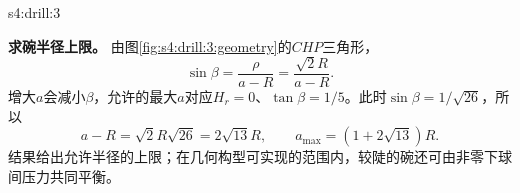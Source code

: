 \begin{drillsolution}{s4:drill:3}
\par\medskip{}\noindent\textbf{求碗半径上限。}
由图\ref{fig:s4:drill:3:geometry}的$CHP$三角形，
\[
 \sin\beta=\frac{\rho}{a-R}=\frac{\sqrt2R}{a-R}.
\]
增大$a$会减小$\beta$，允许的最大$a$对应$H_r=0$、$\tan\beta=1/5$。此时$\sin\beta=1/\sqrt{26}$，所以
\[
 a-R=\sqrt2R\sqrt{26}=2\sqrt{13}R,\qquad
 \boxed{a_{\max}=(1+2\sqrt{13})R}.
\]
结果给出允许半径的上限；在几何构型可实现的范围内，较陡的碗还可由非零下球间压力共同平衡。
\end{drillsolution}
